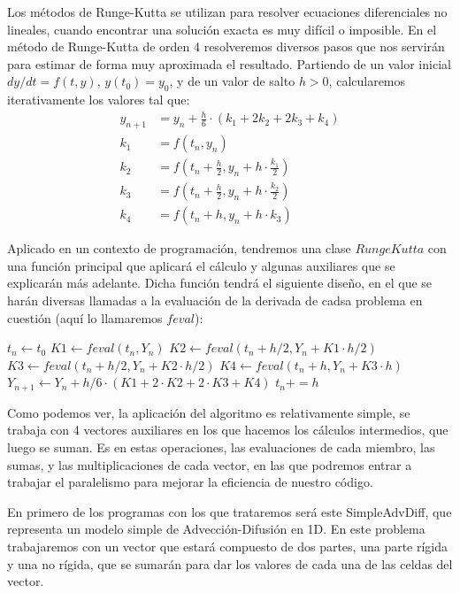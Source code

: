 
Los métodos de Runge-Kutta se utilizan para resolver ecuaciones diferenciales no lineales, cuando encontrar una solución exacta es muy difícil o imposible. En el método de Runge-Kutta de orden 4 resolveremos diversos pasos que nos servirán para estimar de forma muy aproximada el resultado. Partiendo de un valor inicial $dy/dt = f(t,y)$, $y(t_0)=y_0$, y de un valor de salto $h>0$, calcularemos iterativamente los valores tal que:
\begin{equation}
	\label{eq:RungeKutta}
	\begin{split}
		y_{n+1} &= y_n + \frac{h}{6} \cdot (k_1 +2k_2 + 2k_3 + k_4)\\
		k_1 &= f(t_n, y_n)\\
		k_2 &= f \left( t_n + \frac{h}{2}, y_n + h \cdot \frac{k_1}{2} \right) \\
		k_3 &= f \left( t_n + \frac{h}{2}, y_n + h \cdot \frac{k_2}{2} \right) \\
		k_4 &= f(t_n + h, y_n + h \cdot k_3)
	\end{split}
\end{equation}

Aplicado en un contexto de programación, tendremos una clase $RungeKutta$ con una función principal que aplicará el cálculo y algunas auxiliares que se explicarán más adelante. Dicha función tendrá el siguiente diseño, en el que se harán diversas llamadas a la evaluación de la derivada de cadsa problema en cuestión (aquí lo llamaremos $feval$): 

\begin{algorithm}[H] %
	\label{alg:RungeKutta}
	\caption{RungeKutta Orden 4}
	\begin{algorithmic}
		\State $t_n \gets t_0$
		\State $K1 \gets feval(t_n, Y_n)$
		\State $K2 \gets feval(t_n+h/2, Y_n + K1\cdot h/2)$
		\State $K3 \gets feval(t_n+h/2, Y_n + K2\cdot h/2)$
		\State $K4 \gets feval(t_n+h, Y_n + K3\cdot h)$
		\State $Y_{n+1} \gets Y_n + h/6 \cdot (K1 + 2 \cdot K2 + 2 \cdot K3 + K4)$
		\State $t_n += h$
		\EndWhile
	\end{algorithmic}
\end{algorithm}

Como podemos ver, la aplicación del algoritmo es relativamente simple, se trabaja con 4 vectores auxiliares en los que hacemos los cálculos intermedios, que luego se suman. Es en estas operaciones, las evaluaciones de cada miembro, las sumas, y las multiplicaciones de cada vector, en las que podremos entrar a trabajar el paralelismo para mejorar la eficiencia de nuestro  código.



En primero de los programas con los que trataremos será este SimpleAdvDiff, que representa un modelo simple de Advección-Difusión en 1D. En este problema trabajaremos con un vector que estará compuesto de dos partes, una parte rígida y una no rígida, que se sumarán para dar los valores de cada una de las celdas del vector.
